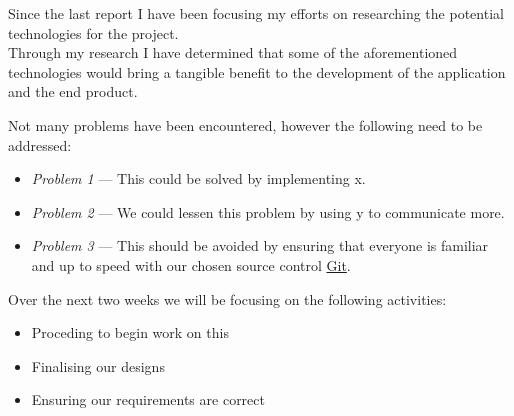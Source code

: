 \documentclass[11pt]{report}
\begin{document}
\pagebreak
\bigskip
{}
\smallskip

\noindent
Since the last report I have been focusing my efforts on researching the potential technologies for the project. \\

\noindent
Through my research I have determined that some of the aforementioned technologies would bring a tangible benefit to the development of the application and the end product. \\

\bigskip
{}
\smallskip

\noindent
Not many problems have been encountered, however the following need to be addressed:

\begin{itemize}
  \item {\it Problem 1\/} --- This could be solved by implementing x.
  \item {\it Problem 2\/} --- We could lessen this problem by using y to communicate more.
  \item {\it Problem 3\/} --- This should be avoided by ensuring that everyone is familiar and up to speed with our chosen source control \href{http://git-scm.com}{Git}.
\end{itemize}

\bigskip
{}
\smallskip

\noindent
Over the next two weeks we will be focusing on the following activities:

\begin{itemize}
  \item Proceding to begin work on this
  \item Finalising our designs
  \item Ensuring our requirements are correct
\end{itemize}
\end{document}

